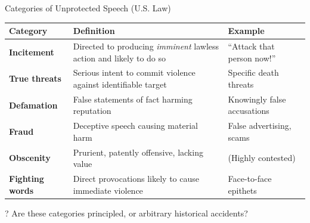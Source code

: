 ﻿\documentclass[aspectratio=169]{beamer}
\begin{document}
\begin{frame}{Categories of Unprotected Speech (U.S. Law)}
\begin{table}[h]
\centering
\small
\begin{tabular}{>{\bfseries}l p{5.5cm} p{4cm}}
\toprule
Category & Definition & Example \\
\midrule
Incitement & Directed to producing \textit{imminent} lawless action and likely to do so & ``Attack that person now!'' \\
True threats & Serious intent to commit violence against identifiable target & Specific death threats \\
Defamation & False statements of fact harming reputation & Knowingly false accusations \\
Fraud & Deceptive speech causing material harm & False advertising, scams \\
Obscenity & Prurient, patently offensive, lacking value & (Highly contested) \\
Fighting words & Direct provocations likely to cause immediate violence & Face-to-face epithets \\
\bottomrule
\end{tabular}
\end{table}

\begin{alertblock}{?}
Are these categories principled, or arbitrary historical accidents?
\end{alertblock}
\end{frame}
\end{document}
